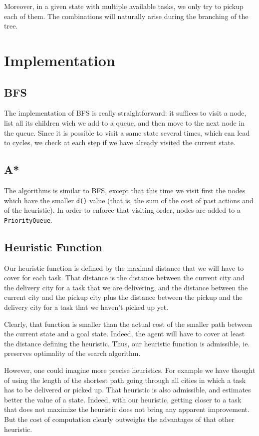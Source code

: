 \documentclass[11pt]{article}
\begin{document}
Moreover, in a given state with multiple available tasks, we only try to pickup each of them. The combinations will naturally arise during the branching of the tree.


\section{Implementation}

\subsection{BFS}
The implementation of BFS is really straightforward: it suffices to visit a node, list all its children wich we add to a queue, and then move to the next node in the queue. Since it is possible to visit a same state several times, which can lead to cycles, we check at each step if we have already visited the current state.

\subsection{A*}
The algorithms is similar to BFS, except that this time we visit first the nodes which have the smaller \texttt{d()} value (that is, the sum of the cost of past actions and of the heuristic). In order to enforce that visiting order, nodes are added to a \texttt{PriorityQueue}. 

\subsection{Heuristic Function}
Our heuristic function is defined by the maximal distance that we will have to cover for each task. That distance is the distance between the current city and the delivery city for a task that we are delivering, and the distance between the current city and the pickup city plus the distance between the pickup and the delivery city for a task that we haven't picked up yet. 

Clearly, that function is smaller than the actual cost of the smaller path between the current state and a goal state. Indeed, the agent will have to cover at least the distance defining the heuristic. Thus, our heuristic function is admissible, ie. preserves optimality of the search algorithm.

However, one could imagine more precise heuristics. For example we have thought of using the length of the shortest path going through all cities in which a task has to be delivered or picked up. That heuristic is also admissible, and estimates better the value of a state. Indeed, with our heuristic, getting closer to a task that does not maximize the heuristic does not bring any apparent improvement. But the cost of computation clearly outweighs the advantages of that other heuristic.
\end{document}
